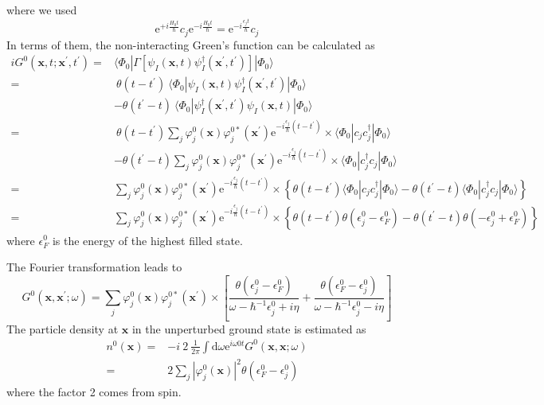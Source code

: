 where we used \[\mathrm{e}^{+i\frac{H_{0}t}{\hbar}}c_{j}\mathrm{e}^{-i\frac{H_{0}t}{\hbar}}=\mathrm{e}^{-i\frac{\epsilon_{j}t}{\hbar}}c_{j}\]
In terms of them, the non-interacting Green's function can be calculated as
\[ \begin{split}
i G^{0}(\mathbf{x},t;\mathbf{x}^{'},t^{'})=& \langle \Phi_{0} | \Gamma [ \psi_{I}(\mathbf{x},t) \psi_{I}^{\dagger}(\mathbf{x}^{'},t^{'}) ] | \Phi_{0} \rangle\\
=& \  \theta(t-t^{'}) \  \langle \Phi_{0} | \psi_{I}(\mathbf{x},t) \psi_{I}^{\dagger}(\mathbf{x}^{'},t^{'}) | \Phi_{0} \rangle \\
&-\theta(t^{'}-t) \  \langle \Phi_{0} | \psi_{I}^{\dagger}(\mathbf{x}^{'},t^{'}) \psi_{I}(\mathbf{x},t) | \Phi_{0} \rangle \\
=& \ \theta(t-t^{'}) \sum_{j} \varphi_{j}^{0}(\mathbf{x})\varphi_{j}^{0*}(\mathbf{x}^{'}) \mathrm{e}^{-i\frac{\epsilon_{j}}{\hbar}(t-t^{'})}
\times \langle \Phi_{0} | c_{j}c_{j}^{\dagger} | \Phi_{0} \rangle \\
&-\theta(t^{'}-t) \sum_{j} \varphi_{j}^{0}(\mathbf{x})\varphi_{j}^{0*}(\mathbf{x}^{'}) \mathrm{e}^{-i\frac{\epsilon_{j}}{\hbar}(t-t^{'})}
\times \langle \Phi_{0} | c_{j}^{\dagger}c_{j} | \Phi_{0} \rangle\\
=&\sum_{j} \varphi_{j}^{0}(\mathbf{x})\varphi_{j}^{0*}(\mathbf{x}^{'}) \mathrm{e}^{-i\frac{\epsilon_{j}}{\hbar}(t-t^{'})} \times \left \{ \theta(t-t^{'})\langle \Phi_{0} | c_{j}c_{j}^{\dagger} | \Phi_{0} \rangle
-\theta(t^{'}-t)\langle \Phi_{0} | c_{j}^{\dagger}c_{j} | \Phi_{0} \rangle \right \}\\
=& \sum_{j} \varphi_{j}^{0}(\mathbf{x})\varphi_{j}^{0*}(\mathbf{x}^{'}) \mathrm{e}^{-i\frac{\epsilon_{j}}{\hbar}(t-t^{'})} \times \left \{ \theta(t-t^{'})\theta(\epsilon_{j}^{0}-\epsilon_{F}^{0}) - \theta(t^{'}-t)\theta(-\epsilon_{j}^{0}+\epsilon_{F}^{0}) \right \}
\end{split} \]
where $\epsilon_{F}^{0}$ is the energy of the highest filled state.

The Fourier transformation leads to
\begin{equation}\label{Eqs2.6.3}
G^{0}(\mathbf{x},\mathbf{x}^{'};\omega) = \sum_{j} \varphi_{j}^{0}(\mathbf{x})\varphi_{j}^{0*}(\mathbf{x}^{'}) \times \left[
\frac{\theta(\epsilon_{j}^{0}-\epsilon_{F}^{0})}{\omega-\hbar^{-1}\epsilon_{j}^{0}+i\eta} +\frac{\theta(\epsilon_{F}^{0}-\epsilon_{j}^{0})}{\omega-\hbar^{-1}\epsilon_{j}^{0}-i\eta}
 \right]
\end{equation}
The particle density at $\mathbf{x}$ in the unperturbed ground state is estimated as
\[ \begin{split} n^{0}(\mathbf{x}) =& -i \  2 \ \frac{1}{2\pi} \int \mathrm{d} \omega \mathrm{e}^{i\omega 0 t} G^{0}(\mathbf{x},\mathbf{x};\omega)\\
=& 2 \sum_{j} |\varphi_{j}^{0}(\mathbf{x})|^{2} \theta(\epsilon_{F}^{0}-\epsilon_{j}^{0})
\end{split}\]
where the factor 2 comes from spin.

